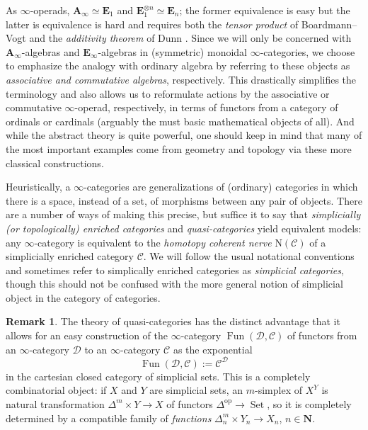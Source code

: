 \documentclass{article}
\theoremstyle{definition}
\newtheorem{remark}{Remark}[subsection]
\newcommand{\C}{\mathcal{C}}
\newcommand{\D}{\mathcal{D}}
\renewcommand{\AA}{\mathbf{A}}
\newcommand{\EE}{\mathbf{E}}
\newcommand{\NN}{\mathbf{N}}
\renewcommand{\i}{\infty}
\newcommand{\op}{\mathrm{op}}
\DeclareMathOperator{\Fun}{Fun}
\DeclareMathOperator{\Set}{Set}
\begin{document}
As $\i$-operads, $\AA_\i\simeq\EE_1$ and $\EE_1^{\otimes n}\simeq\EE_n$; the former equivalence is easy but the latter is equivalence is hard and requires both the {\em tensor product} of Boardmann--Vogt \cite{BV} and the  {\em additivity theorem} of Dunn \cite{Dunn}.
Since we will only be concerned with $\AA_\i$-algebras and $\EE_\i$-algebras in (symmetric) monoidal $\i$-categories, we choose to emphasize the analogy with ordinary algebra by referring to these objects as {\em associative and commutative algebras}, respectively.
This drastically simplifies the terminology and also allows us to reformulate actions by the associative or commutative $\i$-operad, respectively, in terms of functors from a category of ordinals or cardinals (arguably the must basic mathematical objects of all).
And while the abstract theory is quite powerful, one should keep in mind that many of the most important examples come from geometry and topology via these more classical constructions.



Heuristically, a $\infty$-categories are generalizations of (ordinary) categories in which there is a space, instead of a set, of morphisms between any pair of objects.
There are a number of ways of making this precise, but suffice it to say that {\em simplicially (or topologically) enriched categories} and {\em quasi-categories} yield equivalent models:
any $\infty$-category is equivalent to the {\em homotopy coherent nerve} $\mathrm{N}(\C)$ of a simplicially enriched category $\C$.
We will follow the usual notational conventions and sometimes refer to simplically enriched categories as {\em simplicial categories}, though this should not be confused with the more general notion of simplicial object in the category of categories.
\begin{remark}
The theory of quasi-categories \cite{Joy} has the distinct advantage that it allows for an easy construction of the $\i$-category $\Fun(\D,\C)$ of functors from an $\infty$-category $\D$ to an $\i$-category $\C$ as the exponential
\index{$\Fun(\D,\C)$}
\[
\Fun(\D,\C):=\C^{\D}
\]
in the cartesian closed category of simplicial sets.
This is a completely combinatorial object: if $X$ and $Y$ are simplicial sets, an $m$-simplex of $X^Y$ is natural transformation $\Delta^m\times Y\to X$ of functors $\Delta^{\op}\to\Set$, so it is completely determined by a compatible family of {\em functions} $\Delta^m_n\times Y_n\to X_n$, $n\in\NN$.
\end{remark}
\end{document}
